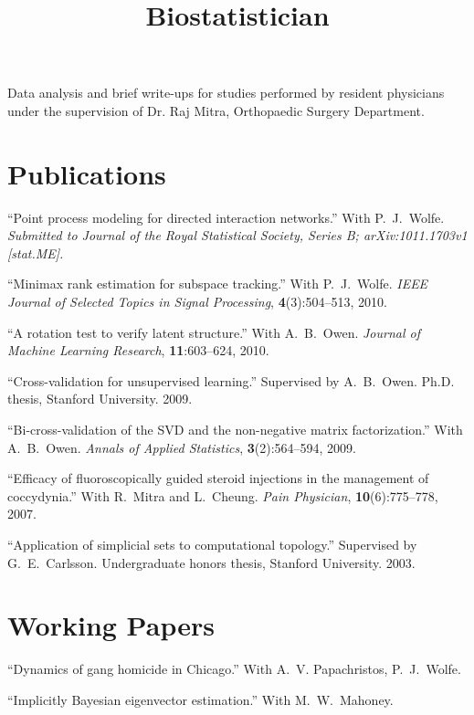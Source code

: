 \documentclass[overlapped,line,letterpaper]{res}
\begin{document}
\begin{resume}
\title{Biostatistician}
\begin{position}
    Data analysis and brief write-ups for studies performed by resident
    physicians under the supervision of Dr. Raj Mitra, Orthopaedic Surgery 
    Department.
\end{position}


\section{\bf Publications}

``Point process modeling for directed interaction networks.''
With P.\ J.\ Wolfe.
\textit{Submitted to Journal of the Royal Statistical Society, Series B; arXiv:1011.1703v1 [stat.ME].}

``Minimax rank estimation for subspace tracking.''
With P.\ J.\ Wolfe.
\textit{IEEE Journal of Selected Topics in Signal Processing},
\textbf{4}(3):504--513, 2010.

``A rotation test to verify latent structure.''
With A.\ B.\ Owen.
\textit{Journal of Machine Learning Research},
\textbf{11}:603--624, 2010.

``Cross-validation for unsupervised learning.''
Supervised by A.\ B.\ Owen.
Ph.D. thesis, Stanford University. 2009.

``Bi-cross-validation of the SVD and the non-negative matrix factorization.''
With A.\ B.\ Owen.
\textit{Annals of Applied Statistics},
\textbf{3}(2):564--594, 2009.

``Efficacy of fluoroscopically guided steroid injections in the management of coccydynia.''
With R.\ Mitra and L.\ Cheung.
\textit{Pain Physician},
\textbf{10}(6):775--778, 2007.

``Application of simplicial sets to computational topology.''
Supervised by G.\ E.\ Carlsson.
Undergraduate honors thesis, Stanford University. 2003.

\section{\bf Working Papers}

``Dynamics of gang homicide in Chicago.''
With A.\ V. Papachristos, P.\ J.\ Wolfe.

``Implicitly Bayesian eigenvector estimation.''
With M.\ W.\ Mahoney.


\end{resume}
\end{document}
